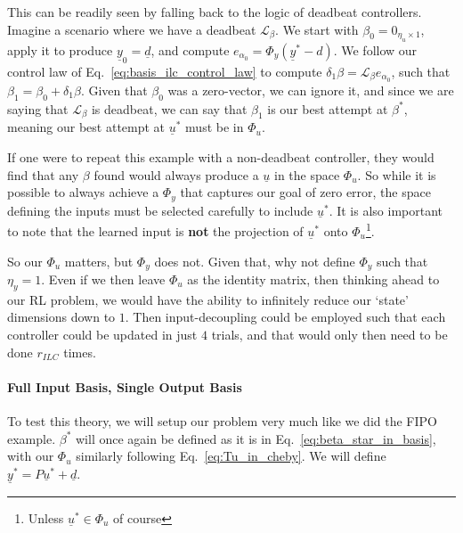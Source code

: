 This can be readily seen by falling back to the logic of deadbeat controllers. Imagine a scenario where we have a deadbeat $\mathcal{L}_\beta$. We start with $\beta_0 = 0_{\eta_u \times 1}$, apply it to produce $\underline{y}_0 = \underline{d}$, and compute $e_{\alpha_0} = \Phi_y (\underline{y}^\ast - d)$. 
We follow our control law of Eq.~\ref{eq:basis_ilc_control_law} to compute $\delta_1 \beta = \mathcal{L}_\beta e_{\alpha_0}$, such that $\beta_1 = \beta_0 + \delta_1 \beta$. Given that $\beta_0$ was a zero-vector, we can ignore it, and since we are saying that $\mathcal{L}_\beta$ is deadbeat, we can say that $\beta_1$ is our best attempt at $\beta^\ast$, meaning our best attempt at $\underline{u}^\ast$ must be in $\Phi_u$.

If one were to repeat this example with a non-deadbeat controller, they would find that any $\beta$ found would always produce a $\underline{u}$ in the space $\Phi_u$. So while it is possible to always achieve a $\Phi_y$ that captures our goal of zero error, the space defining the inputs must be selected carefully to include $\underline{u}^\ast$. It is also important to note that the learned input is \textbf{not} the projection of $\underline{u}^\ast$ onto $\Phi_u$\footnote{Unless $\underline{u}^\ast \in \Phi_u$ of course}.

So our $\Phi_u$ matters, but $\Phi_y$ does not. Given that, why not define $\Phi_y$ such that $\eta_y = 1$. Even if we then leave $\Phi_u$ as the identity matrix, then thinking ahead to our RL problem, we would have the ability to infinitely reduce our `state' dimensions down to $1$. Then input-decoupling could be employed such that each controller could be updated in just $4$ trials, and that would only then need to be done $r_{ILC}$ times. 

\FloatBarrier\paragraph{Full Input Basis, Single Output Basis}
To test this theory, we will setup our problem very much like we did the FIPO example. $\beta^\ast$ will once again be defined as it is in Eq.~\ref{eq:beta_star_in_basis}, with our $\Phi_u$ similarly following Eq.~\ref{eq:Tu_in_cheby}. We will define $\underline{y}^\ast = P\underline{u}^\ast + \underline{d}$.

